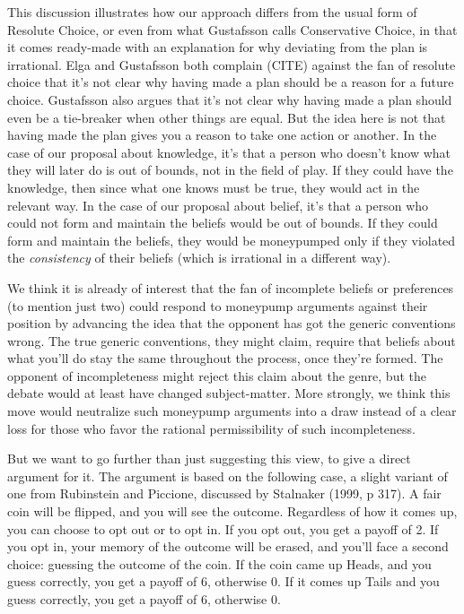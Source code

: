 \documentclass[11pt]{article}
\theoremstyle{definition}
\theoremstyle{definition}
\begin{document}
This discussion illustrates how our approach differs from the usual form of Resolute Choice, or even from what Gustafsson calls Conservative Choice, in that it comes ready-made with an explanation for why deviating from the plan is irrational. Elga and Gustafsson both complain (CITE) against the fan of resolute choice that it's not clear why having made a plan should be a reason for a future choice. Gustafsson also argues that it's not clear why having made a plan should even be a tie-breaker when other things are equal. But the idea here is not that having made the plan gives you a reason to take one action or another. In the case of our proposal about knowledge, it's that a person who doesn't know what they will later do is out of bounds, not in the field of play. If they could have the knowledge, then since what one knows must be true, they would act in the relevant way. In the case of our proposal about belief, it's that a person who could not form and maintain the beliefs would be out of bounds. If they could form and maintain the beliefs, they would be moneypumped only if they violated the \emph{consistency} of their beliefs (which is irrational in a different way).

We think it is already of interest that the fan of incomplete beliefs or preferences (to mention just two) could respond to moneypump arguments against their position by advancing the idea that the opponent has got the generic conventions wrong. The true generic conventions, they might claim, require that beliefs about what you'll do stay the same throughout the process, once they're formed. The opponent of incompleteness might reject this claim about the genre, but the debate would at least have changed subject-matter. More strongly, we think this move would neutralize such moneypump arguments into a draw instead of a clear loss for those who favor the rational permissibility of such incompleteness.

But we want to go further than just suggesting this view, to give a direct argument for it. The argument is based on the following case, a slight variant of one from Rubinstein and Piccione, discussed by Stalnaker (1999, p 317). A fair coin will be flipped, and you will see the outcome. Regardless of how it comes up, you can choose to opt out or to opt in.  If you opt out, you get a payoff of 2. If you opt in, your memory of the outcome will be erased, and you'll face a second choice: guessing the outcome of the coin. If the coin came up Heads, and you guess correctly, you get a payoff of 6, otherwise 0. If it comes up Tails and you guess correctly, you get a payoff of 6, otherwise 0. 
\end{document}

